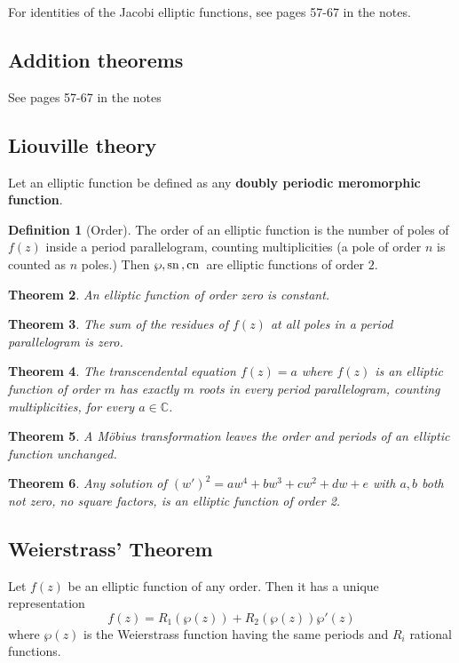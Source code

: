 \documentclass[10pt, oneside, reqno]{amsart}
\theoremstyle{plain}%
\newtheorem{thm}{Theorem}[section]
\theoremstyle{definition}
\newtheorem{defn}[thm]{Definition}
\theoremstyle{remark}
\newcommand{\C}{\mathbb{C}}
\begin{document}
For identities of the Jacobi elliptic functions, see pages 57-67 in the notes.

\subsection{Addition theorems} %
\label{sub:addition_theorems}
See pages 57-67 in the notes

\subsection{Liouville theory} %
\label{sub:liouville_theory}
Let an elliptic function be defined as any \textbf{doubly periodic meromorphic function}.  
\begin{defn}[Order]
	The order of an elliptic function is the number of poles of $f(z)$ inside a period parallelogram, counting multiplicities (a pole of order $n$ is counted as $n$ poles.)  Then $\wp, \text{sn}\,, \text{cn}\,$ are elliptic functions of order $2$.  
\end{defn}

\begin{thm}
	An elliptic function of order zero is constant.
\end{thm}

\begin{thm}
	The sum of the residues of $f(z)$ at all poles in a period parallelogram is zero.
\end{thm}

\begin{thm}
	The transcendental equation $f(z) = a$ where $f(z)$ is an elliptic function of order $m$ has exactly $m$ roots in every period parallelogram, counting multiplicities, for every $a \in \C$.  
\end{thm}

\begin{thm}
	A M\"obius transformation leaves the order and periods of an elliptic function unchanged.  
\end{thm}
\begin{thm}
	Any solution of $(w')^2 = aw^4 + bw^3 + cw^2 +dw + e$ with $a,b$ both not zero, no square factors, is an elliptic function of order 2.
\end{thm}

\subsection{Weierstrass' Theorem} %
\label{sub:weierstrass_theorem}
	Let $f(z)$ be an elliptic function of any order.  Then it has a unique representation \[
		f(z) = R_1(\wp(z)) + R_2(\wp(z)) \wp'(z)
	\] where $\wp(z)$ is the Weierstrass function having the same periods and $R_i$ rational functions.  



\end{document}
